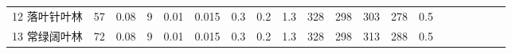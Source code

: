 \begin{sidewaystable}[]
\begin{tabular}{@{}lccccccccccccccccccc@{}}
    12 落叶针叶林       & 57                                                                & 0.08                                                                                                   & 9                                                                                  & 0.01                                                                               & 0.015                                                               & 0.3                                                       & 0.2                                                       & 1.3                                                       & 328                                                             & 298                                                             & 303                                                              & 278                                                               & 0.5                                                          \\ %
%
    13 常绿阔叶林   & 72                                                                & 0.08                                                                                                   & 9                                                                                  & 0.01                                                                               & 0.015                                                               & 0.3                                                       & 0.2                                                       & 1.3                                                       & 328                                                             & 298                                                             & 313                                                              & 288                                                               & 0.5                                                          \\

\end{tabular}
\end{sidewaystable}
